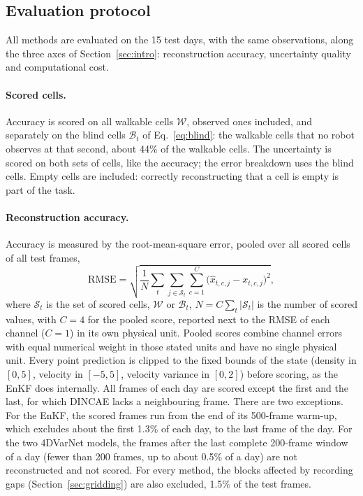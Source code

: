 \documentclass[english, 12pt, a4paper, elec, utf8, a-2b, online]{aaltothesis}
\begin{document}
\FloatBarrier
\subsection{Evaluation protocol}
\label{sec:eval}

All methods are evaluated on the 15 test days, with the same
observations, along the three axes of Section~\ref{sec:intro}: reconstruction
accuracy, uncertainty quality and computational cost.

\paragraph{Scored cells.}
Accuracy is scored on all walkable cells $\mathcal{W}$, observed ones included,
and separately on the blind cells $\mathcal{B}_t$ of Eq.~\eqref{eq:blind}:
the walkable cells that no robot observes at that second, about 44\% of the
walkable cells. The uncertainty is scored on both sets of cells, like the
accuracy; the error breakdown uses the blind cells. Empty cells are included: correctly reconstructing that a cell
is empty is part of the task.

\paragraph{Reconstruction accuracy.}
Accuracy is measured by the root-mean-square error, pooled over all scored
cells of all test frames,
\begin{equation}
	\mathrm{RMSE} = \sqrt{ \frac{1}{N} \sum_{t} \sum_{j \in \mathcal{S}_t} \sum_{c=1}^{C}
	\big( \hat{x}_{t,c,j} - x_{t,c,j} \big)^2 },
	\label{eq:rmse}
\end{equation}
where $\mathcal{S}_t$ is the set of scored cells, $\mathcal{W}$ or $\mathcal{B}_t$,
$N = C \sum_t |\mathcal{S}_t|$ is the number of scored values, with $C = 4$ for the pooled score, reported next to the RMSE of each channel
($C = 1$) in its own physical unit. Pooled scores combine channel errors with
equal numerical weight in those stated units and have no single physical unit.
Every point prediction is clipped to the
fixed bounds of the state (density in $[0, 5]$, velocity in $[-5, 5]$,
velocity variance in $[0, 2]$) before scoring, as the EnKF does internally.
All frames of each day are scored except the first and the last, for which
DINCAE lacks a neighbouring frame. There are two exceptions. For the EnKF, the
scored frames run from the end of its 500-frame warm-up, which excludes about the first
1.3\% of each day, to the last frame of the day. For the two 4DVarNet models, the frames after the last complete
200-frame window of a day (fewer than 200 frames, up to about 0.5\% of a day) are
not reconstructed and not scored. For every method, the blocks affected by
recording gaps (Section~\ref{sec:gridding}) are also excluded, 1.5\% of the
test frames.
\end{document}
